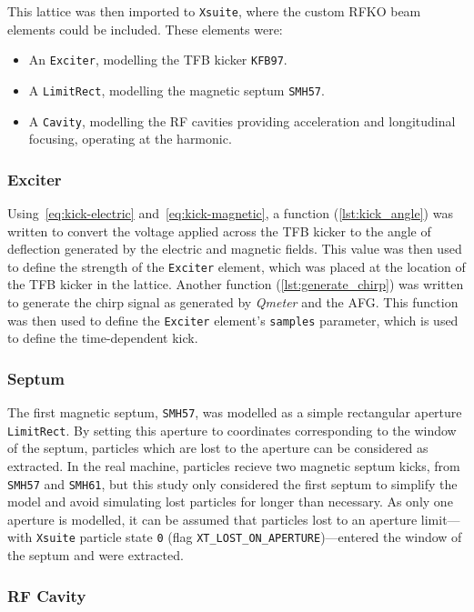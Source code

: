 \documentclass[11pt]{report}
\begin{document}
This lattice was then imported to \verb|Xsuite|, where the custom RFKO beam elements could be included. These elements were:
\begin{itemize}
  \item An \verb|Exciter|, modelling the TFB kicker \verb|KFB97|.
  \item A \verb|LimitRect|, modelling the magnetic septum \verb|SMH57|.
  \item A \verb|Cavity|, modelling the RF cavities providing acceleration and longitudinal focusing, operating at the  harmonic.
\end{itemize}

\subsubsection{Exciter}
Using~\autoref{eq:kick-electric} and~\autoref{eq:kick-magnetic}, a function (\autoref{lst:kick_angle}) was written to convert the voltage applied across the TFB kicker to the angle of deflection generated by the electric and magnetic fields. This value was then used to define the strength of the \verb|Exciter| element, which was placed at the location of the TFB kicker in the lattice. Another function (\autoref{lst:generate_chirp}) was written to generate the chirp signal as generated by \textit{Qmeter} and the AFG. This function was then used to define the \verb|Exciter| element's \verb|samples| parameter, which is used to define the time-dependent kick. 

\subsubsection{Septum}\label{sec:septum}
The first magnetic septum, \verb|SMH57|, was modelled as a simple rectangular aperture \verb|LimitRect|. By setting this aperture to coordinates corresponding to the window of the septum, particles which are lost to the aperture can be considered as extracted. In the real machine, particles recieve two magnetic septum kicks, from \verb|SMH57| and \verb|SMH61|, but this study only considered the first septum to simplify the model and avoid simulating lost particles for longer than necessary. As only one aperture is modelled, it can be assumed that particles lost to an aperture limit---with \verb|Xsuite| particle state \verb|0| (flag \verb|XT_LOST_ON_APERTURE|)---entered the window of the septum and were extracted. %

\subsubsection{RF Cavity}
\end{document}
